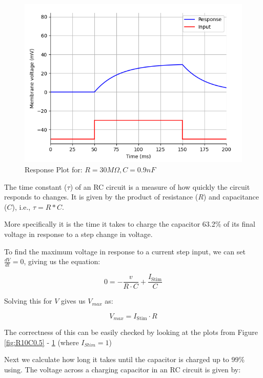 \documentclass{article}
\begin{document}
\begin{figure}[htbp]
\begin{minipage}[b]{0.3\textwidth}
        \end{minipage}
        \hfill
        \begin{minipage}[b]{0.3\textwidth}
            \includegraphics[width=\textwidth]{R30C0.9.png}
            \caption{Response Plot for: $R = 30 M\Omega, C = 0.9nF$}
            \label{fig:R30C0.9}
        \end{minipage}
    \end{figure}

    The time constant ($\tau$) of an RC circuit is a measure of how quickly the circuit responds to changes. It is given by the product of resistance ($R$) and capacitance ($C$), i.e., $\tau = R * C$.

    More specifically it is the time it takes to charge the capacitor 63.2\% of its final voltage in response to a step change in voltage.

    To find the maximum voltage in response to a current step input, we can set $\frac{dV}{dt} = 0$, giving us the equation:

    \[ 0 = -\frac{v}{R \cdot C} + \frac{I_{\text{Stim}}}{C} \]

    Solving this for $V$ gives us $V_{max}$ as:

    \[ V_{max} = I_{\text{Stim}} \cdot R \]

    The correctness of this can be easily checked by looking at the plots from Figure \ref{fig:R10C0.5} - \ref{fig:R30C0.9} (where $I_{Stim} = 1$)

    Next we calculate how long it takes until the capacitor is charged up to 99\% using. The voltage across a charging capacitor in an RC circuit is given by:
\end{document}
